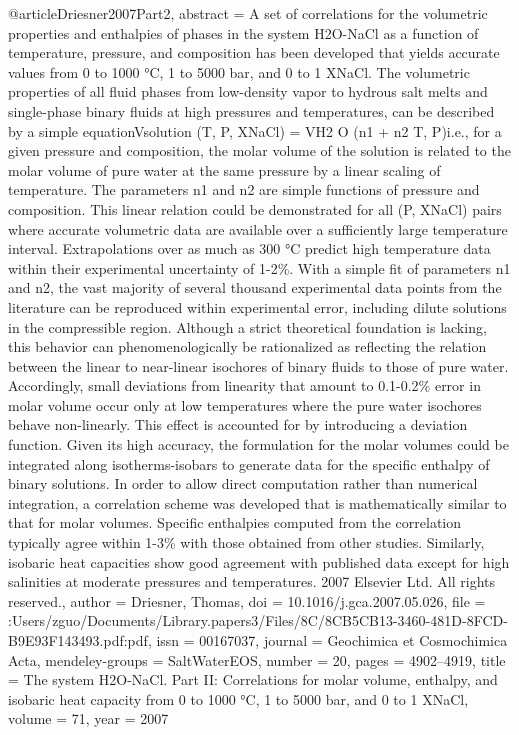 @article{Driesner2007Part2,
abstract = {A set of correlations for the volumetric properties and enthalpies of phases in the system H2O-NaCl as a function of temperature, pressure, and composition has been developed that yields accurate values from 0 to 1000 °C, 1 to 5000 bar, and 0 to 1 XNaCl. The volumetric properties of all fluid phases from low-density vapor to hydrous salt melts and single-phase binary fluids at high pressures and temperatures, can be described by a simple equationVsolution (T, P, XNaCl) = VH2 O (n1 + n2 T, P)i.e., for a given pressure and composition, the molar volume of the solution is related to the molar volume of pure water at the same pressure by a linear scaling of temperature. The parameters n1 and n2 are simple functions of pressure and composition. This linear relation could be demonstrated for all (P, XNaCl) pairs where accurate volumetric data are available over a sufficiently large temperature interval. Extrapolations over as much as 300 °C predict high temperature data within their experimental uncertainty of 1-2{\%}. With a simple fit of parameters n1 and n2, the vast majority of several thousand experimental data points from the literature can be reproduced within experimental error, including dilute solutions in the compressible region. Although a strict theoretical foundation is lacking, this behavior can phenomenologically be rationalized as reflecting the relation between the linear to near-linear isochores of binary fluids to those of pure water. Accordingly, small deviations from linearity that amount to 0.1-0.2{\%} error in molar volume occur only at low temperatures where the pure water isochores behave non-linearly. This effect is accounted for by introducing a deviation function. Given its high accuracy, the formulation for the molar volumes could be integrated along isotherms-isobars to generate data for the specific enthalpy of binary solutions. In order to allow direct computation rather than numerical integration, a correlation scheme was developed that is mathematically similar to that for molar volumes. Specific enthalpies computed from the correlation typically agree within 1-3{\%} with those obtained from other studies. Similarly, isobaric heat capacities show good agreement with published data except for high salinities at moderate pressures and temperatures. {\textcopyright} 2007 Elsevier Ltd. All rights reserved.},
author = {Driesner, Thomas},
doi = {10.1016/j.gca.2007.05.026},
file = {:Users/zguo/Documents/Library.papers3/Files/8C/8CB5CB13-3460-481D-8FCD-B9E93F143493.pdf:pdf},
issn = {00167037},
journal = {Geochimica et Cosmochimica Acta},
mendeley-groups = {SaltWaterEOS},
number = {20},
pages = {4902--4919},
title = {{The system H2O-NaCl. Part II: Correlations for molar volume, enthalpy, and isobaric heat capacity from 0 to 1000 °C, 1 to 5000 bar, and 0 to 1 XNaCl}},
volume = {71},
year = {2007}
}
